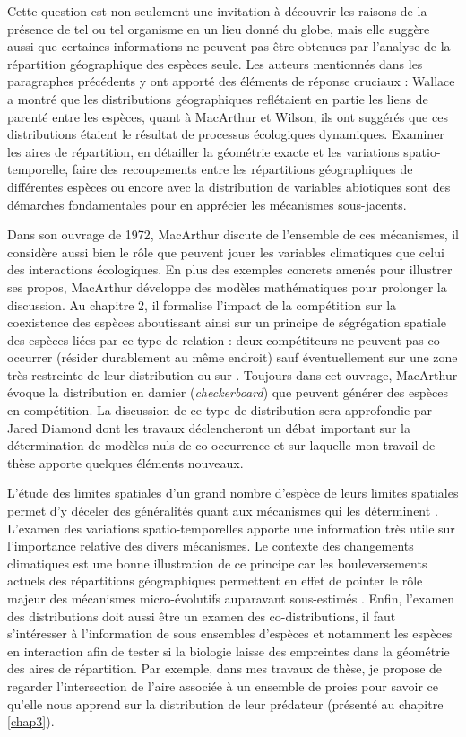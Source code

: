 Cette question est non seulement une invitation à découvrir les raisons
de la présence de tel ou tel organisme en un lieu donné du globe, mais
elle suggère aussi que certaines informations ne peuvent pas être
obtenues par l'analyse de la répartition géographique des espèces seule.
Les auteurs mentionnés dans les paragraphes précédents y ont apporté des
éléments de réponse cruciaux : Wallace a montré que les distributions
géographiques reflétaient en partie les liens de parenté entre les
espèces, quant à MacArthur et Wilson, ils ont suggérés que ces
distributions étaient le résultat de processus écologiques dynamiques.
Examiner les aires de répartition, en détailler la géométrie exacte et
les variations spatio-temporelle, faire des recoupements entre les
répartitions géographiques de différentes espèces ou encore avec la
distribution de variables abiotiques sont des démarches fondamentales
pour en apprécier les mécanismes sous-jacents.

Dans son ouvrage de 1972, MacArthur discute de l'ensemble de ces
mécanismes, il considère aussi bien le rôle que peuvent jouer les
variables climatiques que celui des interactions écologiques. En plus
des exemples concrets amenés pour illustrer ses propos, MacArthur
développe des modèles mathématiques pour prolonger la discussion. Au
chapitre 2, il formalise l'impact de la compétition sur la coexistence
des espèces aboutissant ainsi sur un principe de ségrégation spatiale
des espèces liées par ce type de relation : deux compétiteurs ne peuvent
pas co-occurrer (résider durablement au même endroit) sauf
éventuellement sur une zone très restreinte de leur distribution
\citep{macarthur1972geographical} ou sur . Toujours dans cet ouvrage,
MacArthur évoque la distribution en damier (\emph{checkerboard}) que
peuvent générer des espèces en compétition. La discussion de ce type de
distribution sera approfondie par Jared Diamond \citep{Diamond1975} dont
les travaux déclencheront un débat important sur la détermination de
modèles nuls de co-occurrence \citep{Connor1979} et sur laquelle mon
travail de thèse apporte quelques éléments nouveaux.

L'étude des limites spatiales d'un grand nombre d'espèce de leurs
limites spatiales permet d'y déceler des généralités quant aux
mécanismes qui les déterminent \citep{macarthur1972geographical}.
L'examen des variations spatio-temporelles apporte une information très
utile sur l'importance relative des divers mécanismes. Le contexte des
changements climatiques est une bonne illustration de ce principe car
les bouleversements actuels des répartitions géographiques permettent en
effet de pointer le rôle majeur des mécanismes micro-évolutifs
auparavant sous-estimés \citep{Lavergne2010}. Enfin, l'examen des
distributions doit aussi être un examen des co-distributions, il faut
s'intéresser à l'information de sous ensembles d'espèces et notamment
les espèces en interaction afin de tester si la biologie laisse des
empreintes dans la géométrie des aires de répartition. Par exemple, dans
mes travaux de thèse, je propose de regarder l'intersection de l'aire
associée à un ensemble de proies pour savoir ce qu'elle nous apprend sur
la distribution de leur prédateur (présenté au chapitre \ref{chap3}).

